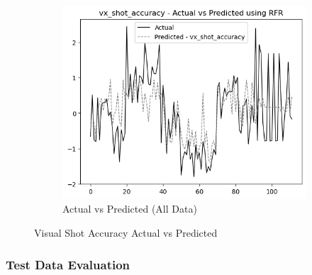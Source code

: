\begin{figure}[htbp]
\begin{subfigure}[b]{0.49\textwidth}
        \includegraphics[width=\textwidth]{images/regressionCharts/all_data_visual_shot_accuracy.png}
        \caption{Actual vs Predicted (All Data)}
        \label{fig:actual_vs_predicted_vx_shot_accuracy_all_data}
    \end{subfigure}
    \caption{Visual Shot Accuracy Actual vs Predicted}
    \label{fig:visual_shot_accuracy_comparison}
\end{figure}

\subsubsection*{Test Data Evaluation}

